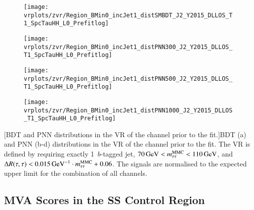 {
  \centering

  \vspace*{1em}


  \begin{subfigure}{0.495\textwidth}
    \centering

    \texttt{[image: vrplots/zvr/Region\_BMin0\_incJet1\_distSMBDT\_J2\_Y2015\_DLLOS\_T1\_SpcTauHH\_L0\_Prefitlog]}
    \subcaption{}
  \end{subfigure}\hfill%
  \begin{subfigure}{0.495\textwidth}
    \centering

    \texttt{[image: vrplots/zvr/Region\_BMin0\_incJet1\_distPNN300\_J2\_Y2015\_DLLOS\_T1\_SpcTauHH\_L0\_Prefitlog]}
    \subcaption{}
  \end{subfigure}

  \begin{subfigure}{0.495\textwidth}
    \centering

    \texttt{[image: vrplots/zvr/Region\_BMin0\_incJet1\_distPNN500\_J2\_Y2015\_DLLOS\_T1\_SpcTauHH\_L0\_Prefitlog]}
    \subcaption{}
  \end{subfigure}\hfill%
  \begin{subfigure}{0.495\textwidth}
    \centering

    \texttt{[image: vrplots/zvr/Region\_BMin0\_incJet1\_distPNN1000\_J2\_Y2015\_DLLOS\_T1\_SpcTauHH\_L0\_Prefitlog]}
    \subcaption{}
  \end{subfigure}

  [BDT and PNN distributions in the \Zjets VR of the \hadhad
  channel prior to the fit.]{BDT (a) and PNN (b-d) distributions in the \Zjets
    VR of the \hadhad channel prior to the fit. The \Zjets VR is defined by
    requiring exactly 1~$b$-tagged jet,
    $\SI{70}{\ensuremath{\text{GeV}}} < m_{\tau\tau}^\text{MMC} < \SI{110}{\ensuremath{\text{GeV}}}$, and
    $\dRtautau < \SI{0.015}{\per\GeV} \cdot \mMMC + 0.06$. The signals are
    normalised to the expected upper limit for the combination of all channels.}
}


\clearpage
\subsection*{MVA Scores in the SS Control Region}

